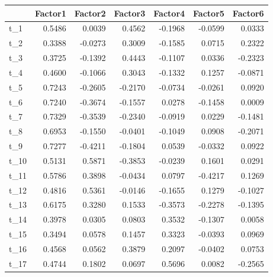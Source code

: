 \documentclass[
]{article}
\newenvironment{Shaded}{\begin{snugshade}}{\end{snugshade}}
\newcommand{\AttributeTok}[1]{\textcolor[rgb]{0.13,0.29,0.53}{#1}}
\newcommand{\DecValTok}[1]{\textcolor[rgb]{0.00,0.00,0.81}{#1}}
\newcommand{\FunctionTok}[1]{\textcolor[rgb]{0.13,0.29,0.53}{\textbf{#1}}}
\newcommand{\NormalTok}[1]{#1}
\newcommand{\OtherTok}[1]{\textcolor[rgb]{0.56,0.35,0.01}{#1}}
\newcommand{\SpecialCharTok}[1]{\textcolor[rgb]{0.81,0.36,0.00}{\textbf{#1}}}
\newcommand{\StringTok}[1]{\textcolor[rgb]{0.31,0.60,0.02}{#1}}
\theoremstyle{plain}
\begin{document}
\smallskip

\begin{Shaded}
\end{Shaded}

\begin{longtable}[]{@{}lrrrrrr@{}}
\toprule\noalign{}
& Factor1 & Factor2 & Factor3 & Factor4 & Factor5 & Factor6 \\
\midrule\noalign{}
\endhead
\bottomrule\noalign{}
\endlastfoot
t\_1 & 0.5486 & 0.0039 & 0.4562 & -0.1968 & -0.0599 & 0.0333 \\
t\_2 & 0.3388 & -0.0273 & 0.3009 & -0.1585 & 0.0715 & 0.2322 \\
t\_3 & 0.3725 & -0.1392 & 0.4443 & -0.1107 & 0.0336 & -0.2323 \\
t\_4 & 0.4600 & -0.1066 & 0.3043 & -0.1332 & 0.1257 & -0.0871 \\
t\_5 & 0.7243 & -0.2605 & -0.2170 & -0.0734 & -0.0261 & 0.0920 \\
t\_6 & 0.7240 & -0.3674 & -0.1557 & 0.0278 & -0.1458 & 0.0009 \\
t\_7 & 0.7329 & -0.3539 & -0.2340 & -0.0919 & 0.0229 & -0.1481 \\
t\_8 & 0.6953 & -0.1550 & -0.0401 & -0.1049 & 0.0908 & -0.2071 \\
t\_9 & 0.7277 & -0.4211 & -0.1804 & 0.0539 & -0.0332 & 0.0922 \\
t\_10 & 0.5131 & 0.5871 & -0.3853 & -0.0239 & 0.1601 & 0.0291 \\
t\_11 & 0.5786 & 0.3898 & -0.0434 & 0.0797 & -0.4217 & 0.1269 \\
t\_12 & 0.4816 & 0.5361 & -0.0146 & -0.1655 & 0.1279 & -0.1027 \\
t\_13 & 0.6175 & 0.3280 & 0.1533 & -0.3573 & -0.2278 & -0.1395 \\
t\_14 & 0.3978 & 0.0305 & 0.0803 & 0.3532 & -0.1307 & 0.0058 \\
t\_15 & 0.3494 & 0.0578 & 0.1457 & 0.3323 & -0.0393 & 0.0969 \\
t\_16 & 0.4568 & 0.0562 & 0.3879 & 0.2097 & -0.0402 & 0.0753 \\
t\_17 & 0.4744 & 0.1802 & 0.0697 & 0.5696 & 0.0082 & -0.2565 \\

\end{longtable}
\end{document}
